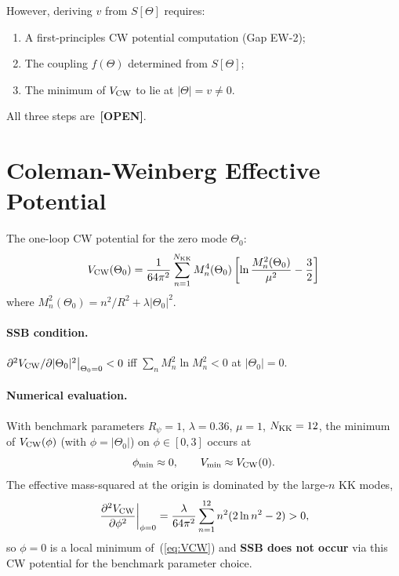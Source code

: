 \documentclass[12pt,a4paper]{article}
\begin{document}
However, deriving $v$ from $S[\Theta]$ requires:
\begin{enumerate}
\item A first-principles CW potential computation (Gap EW-2);
\item The coupling $f(\Theta)$ determined from $S[\Theta]$;
\item The minimum of $V_{\rm CW}$ to lie at $|\Theta| = v \neq 0$.
\end{enumerate}
All three steps are~\textbf{[OPEN]}.

\section{Coleman-Weinberg Effective Potential}
\label{sec:coleman_weinberg}

The one-loop CW potential for the zero mode $\Theta_0$:
\begin{equation}
\label{eq:VCW}
V_{\rm CW}(\Theta_0) = \frac{1}{64\pi^2}
\sum_{n=1}^{N_{\rm KK}} M_n^4(\Theta_0)
\left[\ln\frac{M_n^2(\Theta_0)}{\mu^2} - \frac{3}{2}\right]
\end{equation}
where $M_n^2(\Theta_0) = n^2/R^2 + \lambda|\Theta_0|^2$.

\paragraph{SSB condition.}
$\partial^2 V_{\rm CW}/\partial|\Theta_0|^2\big|_{\Theta_0=0} < 0$
iff $\sum_n M_n^2 \ln M_n^2 < 0$ at $|\Theta_0|=0$.

\paragraph{Numerical evaluation.}
With benchmark parameters $R_\psi=1$, $\lambda=0.36$, $\mu=1$,
$N_{\rm KK}=12$, the minimum of $V_{\rm CW}(\phi)$ (with
$\phi = |\Theta_0|$) on $\phi\in[0,3]$ occurs at
\[
  \phi_{\rm min} \approx 0, \qquad
  V_{\rm min} \approx V_{\rm CW}(0).
\]
The effective mass-squared at the origin is dominated by the
large-$n$ KK modes,
\[
  \left.\frac{\partial^2 V_{\rm CW}}{\partial \phi^2}\right|_{\phi=0}
  = \frac{\lambda}{64\pi^2}\sum_{n=1}^{12} n^2(2\ln n^2 - 2) > 0,
\]
so $\phi=0$ is a local minimum of~(\ref{eq:VCW}) and
\textbf{SSB does not occur} via this CW potential for the
benchmark parameter choice.
\end{document}
